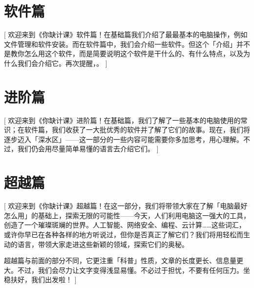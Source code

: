 \documentclass[a4paper]{book}
\begin{document}
\part{软件篇}[
  欢迎来到《你缺计课》软件篇！在基础篇我们介绍了最最基本的电脑操作，例如文件管理和软件安装。而在软件篇中，我们会介绍一些软件。但这个「介绍」并不是教你怎么用这个软件，而是简要说明这个软件是干什么的、有什么特点，以及为什么我们会介绍它。再次提醒，。
]








\part{进阶篇}[
  欢迎来到《你缺计课》进阶篇！在基础篇，我们了解了一些基本的电脑使用的常识；在软件篇，我们收获了一大批优秀的软件并了解了它们的故事。现在，我们将逐步迈入「深水区」——这一部分的一些内容可能需要你多加思考，用心理解。不过，我们仍会用尽量简单易懂的语言去介绍它们。
]








\part{超越篇}[
  欢迎来到《你缺计课》超越篇！在这一部分，我们将带领大家在了解「电脑最好怎么用」的基础上，探索无限的可能性——今天，人们利用电脑这一强大的工具，创造了一个璀璨斑斓的世界。人工智能、网络安全、编程、云计算……这些词汇，或许你早已在各种各样的地方听说过，但你是否真正了解它们？我们将用轻松而生动的语言，带领大家走进这些新颖的领域，探索它们的奥秘。

  超越篇与前面的部分不同，它更注重「科普」性质，文章的长度更长、信息量更大。不过，我们会尽力让文字变得浅显易懂。不必过于担忧，不要有任何压力。坐稳扶好，我们出发啦！
]





% 
% 

% 
\end{document}
